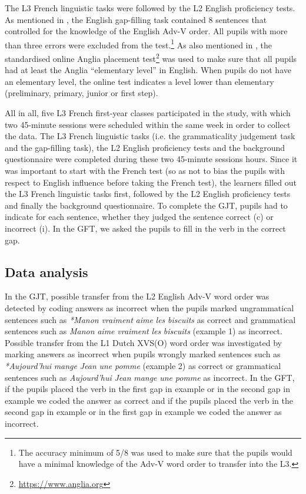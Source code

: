 \documentclass[output=paper]{langsci/langscibook}
\begin{document}
The L3 French linguistic tasks were followed by the L2 English proficiency tests. As mentioned in , the English gap-filling task contained 8 sentences that controlled for the knowledge of the English Adv-V order. All pupils with more than three errors were excluded from the test.\footnote{The accuracy minimum of 5/8 was used to make sure that the pupils would have a minimal knowledge of the Adv-V word order to transfer into the L3.} As also mentioned in , the standardised online Anglia placement test\footnote{\url{https://www.anglia.org}} was used to make sure that all pupils had at least the Anglia ``elementary level'' in English. When pupils do not have an elementary level, the online test indicates a level lower than elementary (preliminary, primary, junior or first step).

All in all, five L3 French first-year classes participated in the study, with which two 45-minute sessions were scheduled within the same week in order to collect the data. The L3 French linguistic tasks (i.e. the grammaticality judgement task and the gap-filling task), the L2 English proficiency tests and the background questionnaire were completed during these two 45-minute sessions hours. Since it was important to start with the French test (so as not to bias the pupils with respect to English influence before taking the French test), the learners filled out the L3 French linguistic tasks first, followed by the L2 English proficiency tests and finally the background questionnaire. To complete the GJT, pupils had to indicate for each sentence, whether they judged the sentence correct (c) or incorrect (i). In the GFT, we asked the pupils to fill in the verb in the correct gap.

\subsection{{Data} {analysis} }
\label{sec:stadt:3.5}

In the GJT, possible transfer from the L2 English Adv-V word order was detected by coding answers as incorrect when the pupils marked ungrammatical sentences such as \textit{*Manon} \textit{vraiment} \textit{aime} \textit{les} \textit{biscuits} as correct and grammatical sentences such as \textit{Manon} \textit{aime} \textit{vraiment} \textit{les} \textit{biscuits} (example 1) as incorrect. Possible transfer from the L1 Dutch XVS(O) word order was investigated by marking answers as incorrect when pupils wrongly marked sentences such as \textit{*Aujourd’hui} \textit{mange} \textit{Jean} \textit{une} \textit{pomme} (example 2) as correct or grammatical sentences such as \textit{Aujourd’hui} \textit{Jean} \textit{mange} \textit{une} \textit{pomme} as incorrect. In the GFT, if the pupils placed the verb in the first gap in example  or in the second gap in example  we coded the answer as correct and if the pupils placed the verb in the second gap in example  or in the first gap in example  we coded the answer as incorrect.
\end{document}
